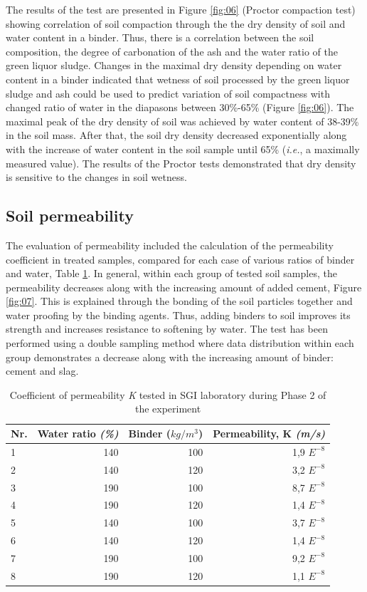 \documentclass{amestyle}
\begin{document}
The results of the test are presented in Figure \ref{fig:06} (Proctor compaction test) showing correlation of soil compaction through the the dry density of soil and water content in a binder. Thus, there is a correlation between the soil composition, the degree of carbonation of the ash and the water ratio of the green liquor sludge. Changes in the maximal dry density depending on water content in a binder indicated that wetness of soil processed by the green liquor sludge and ash could be used to predict variation of soil compactness with changed ratio of water in the diapasons between 30\%-65\% (Figure \ref{fig:06}). The maximal peak of the dry density of soil was achieved by water content of 38-39\% in the soil mass. After that, the soil dry density decreased exponentially along with the increase of water content in the soil sample until 65\% (\emph{i.e.}, a maximally measured value). The results of the Proctor tests demonstrated that dry density is sensitive to the changes in soil wetness.

\subsection{Soil permeability}
 The evaluation of permeability included the calculation of the permeability coefficient in treated samples, compared for each case of various ratios of binder and water, Table \ref{tab:1}. In general, within each group of tested soil samples, the permeability decreases along with the increasing amount of added cement, Figure \ref{fig:07}. This is explained through the bonding of the soil particles together and water proofing by the binding agents. Thus, adding binders to soil improves its strength and increases resistance to softening by water. The test has been performed using a double sampling method where data distribution within each group demonstrates a decrease along with the increasing amount of binder: cement and slag. 

\begin{table}[htbp]
  \caption{Coefficient of permeability \emph{K} tested in SGI laboratory during Phase 2 of the experiment}
  \label{tab:1}
  \centering
  \begin{tabular}{| l | r | r | r |}
    \hline
    \multicolumn{1}{|c|}{Nr.} &
    \multicolumn{1}{|c|}{Water ratio \emph{(\%)}} &
    \multicolumn{1}{|c|}{Binder ($kg/m^3$)} &
    \multicolumn{1}{|c|}{Permeability, K \emph{(m/s)}} \\\hline
    1 & 140 & 100 & 1,9 $E^{-8}$ \\
    2 & 140 & 120 & 3,2 $E^{-8}$ \\
    3 & 190 & 100 & 8,7 $E^{-8}$ \\
    4 & 190 & 120 & 1,4 $E^{-8}$ \\
    5 & 140 & 100 & 3,7 $E^{-8}$ \\
    6 & 140 & 120 & 1,4 $E^{-8}$ \\
    7 & 190 & 100 & 9,2 $E^{-8}$ \\
    8 & 190 & 120 & 1,1 $E^{-8}$ \\\hline
  \end{tabular}
\end{table}
\end{document}

